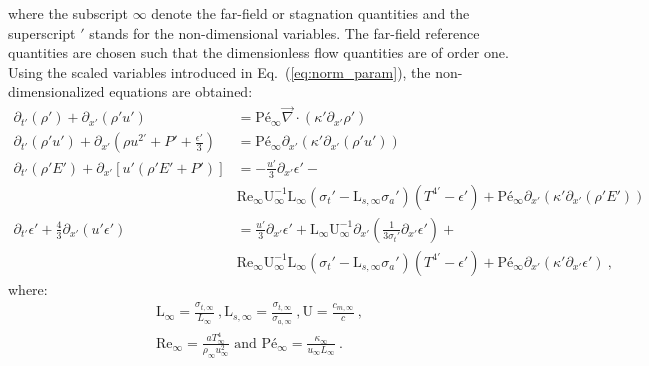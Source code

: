 \documentclass[review]{elsarticle}
\newcommand{\eqt}[1]{Eq.~(\ref{#1})}                     %
\renewcommand{\div}{\vec{\nabla}\! \cdot \!}
\renewcommand{\Re}{\textrm{Re}}
\newcommand{\Us}{\textrm{U}}
\newcommand{\Ls}{\textrm{L}}
\newcommand{\Pe}{\textrm{P\'e}}
\begin{document}
%
where  the subscript $\infty$ denote the far-field or stagnation quantities and the superscript $'$ 
stands for the non-dimensional variables. The far-field reference quantities are chosen such that the 
dimensionless flow quantities are of order one. Using the scaled variables introduced in \eqt{eq:norm_param}, the non-dimensionalized equations are obtained:
%
\begin{align}
\label{eq:equation-visc-reg-scaled}
\partial_{t'} \left( \rho' \right) + \partial_{x'}\left( \rho' u' \right) &= \Pe_\infty \div \left( \kappa' \partial_{x'} \rho' \right) \nonumber \\
\partial_{t'} \left( \rho' u'\right) + \partial_{x'} \left(\rho u^{2'} + P' + \frac{\epsilon'}{3} \right) &= \Pe_\infty \partial_{x'} \left( \kappa' \partial_{x'} (\rho' u') \right) \nonumber \\
\partial_{t'} \left( \rho' E'\right) + \partial_{x'} \left[ u' \left( \rho' E' + P' \right) \right] &= -\frac{u'}{3} \partial_{x'} \epsilon' - \nonumber \\ 
&\Re_\infty \Us^{-1}_\infty \Ls_\infty \left( \sigma_t' - \Ls_{s,\infty} \sigma_a' \right)  \left(T^{4'} - \epsilon' \right) + \Pe_\infty \partial_{x'} \left( \kappa' \partial_{x'} (\rho' E')\right)  \\
\partial_{t'} \epsilon' + \frac{4}{3} \partial_{x'} \left( u' \epsilon' \right) &= \frac{u'}{3} \partial_{x'} \epsilon' + \Ls_\infty \Us^{-1}_\infty \partial_{x'} \left( \frac{1}{3 \sigma_t'} \partial_{x'} \epsilon' \right) + \nonumber \\
&\Re_\infty \Us^{-1}_\infty \Ls_\infty \left( \sigma_t' - \Ls_{s,\infty} \sigma_a' \right) \left( T^{4'} - \epsilon' \right) + \Pe_\infty \partial_{x'} \left( \kappa' \partial_{x'} \epsilon' \right) \ ,  \nonumber 
\end{align}
%
where:
%
\begin{multline}\label{eq:scaled-nb}
\Ls_\infty = \frac{\sigma_{t,\infty}}{L_\infty} \ , \Ls_{s,\infty} = \frac{\sigma_{t,\infty}}{\sigma_{a,\infty}} \ , \Us = \frac{c_{m,\infty}}{c} \ , \\  \Re_\infty = \frac{a T^4_\infty}{\rho_\infty u^2_\infty} \text{ and } \Pe_\infty = \frac{\kappa_\infty}{u_\infty L_\infty} \ .
\end{multline}
%
\end{document}
